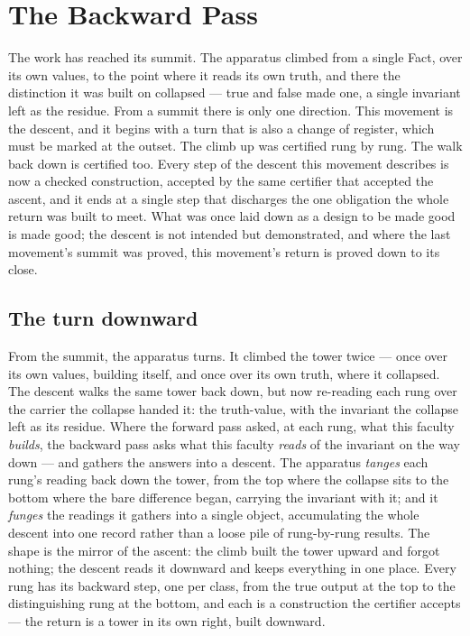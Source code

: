 \chapter{The Backward Pass}
\label{chap:the-backward-pass}

The work has reached its summit. The apparatus climbed from a single Fact, over its own values, to the
point where it reads its own truth, and there the distinction it was built on collapsed --- true and false
made one, a single invariant left as the residue. From a summit there is only one direction. This movement
is the descent, and it begins with a turn that is also a change of register, which must be marked at the
outset. The climb up was certified rung by rung. The walk back down is certified too. Every step of the descent this movement
describes is now a checked construction, accepted by the same certifier that accepted the ascent, and it
ends at a single step that discharges the one obligation the whole return was built to meet. What was once
laid down as a design to be made good is made good; the descent is not intended but demonstrated, and where
the last movement's summit was proved, this movement's return is proved down to its close.

\section{The turn downward}
\label{se:the-turn-downward}

From the summit, the apparatus turns. It climbed the tower twice --- once over its own values, building
itself, and once over its own truth, where it collapsed. The descent walks the same tower back down, but
now re-reading each rung over the carrier the collapse handed it: the truth-value, with the invariant the
collapse left as its residue. Where the forward pass asked, at each rung, what this faculty \emph{builds},
the backward pass asks what this faculty \emph{reads} of the invariant on the way down --- and gathers the
answers into a descent. The apparatus \emph{tanges} each rung's reading back down the tower, from the top
where the collapse sits to the bottom where the bare difference began, carrying the invariant with it; and
it \emph{funges} the readings it gathers into a single object, accumulating the whole descent into one
record rather than a loose pile of rung-by-rung results. The shape is the mirror of the ascent: the climb
built the tower upward and forgot nothing; the descent reads it downward and keeps everything in one place.
Every rung has its backward step, one per class, from the true output at the top to the distinguishing rung
at the bottom, and each is a construction the certifier accepts --- the return is a tower in its own right,
built downward.


